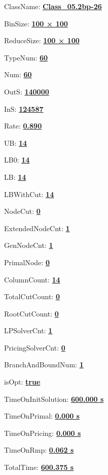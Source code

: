 \documentclass[11pt]{article}
\begin{document}
\pagestyle{empty}


ClassName: \underline{\textbf{Class_05.2bp-26}}
\par
BinSize: \underline{\textbf{100 × 100}}
\par
ReduceSize: \underline{\textbf{100 × 100}}
\par
TypeNum: \underline{\textbf{60}}
\par
Num: \underline{\textbf{60}}
\par
OutS: \underline{\textbf{140000}}
\par
InS: \underline{\textbf{124587}}
\par
Rate: \underline{\textbf{0.890}}
\par
UB: \underline{\textbf{14}}
\par
LB0: \underline{\textbf{14}}
\par
LB: \underline{\textbf{14}}
\par
LBWithCut: \underline{\textbf{14}}
\par
NodeCut: \underline{\textbf{0}}
\par
ExtendedNodeCnt: \underline{\textbf{1}}
\par
GenNodeCnt: \underline{\textbf{1}}
\par
PrimalNode: \underline{\textbf{0}}
\par
ColumnCount: \underline{\textbf{14}}
\par
TotalCutCount: \underline{\textbf{0}}
\par
RootCutCount: \underline{\textbf{0}}
\par
LPSolverCnt: \underline{\textbf{1}}
\par
PricingSolverCnt: \underline{\textbf{0}}
\par
BranchAndBoundNum: \underline{\textbf{1}}
\par
isOpt: \underline{\textbf{true}}
\par
TimeOnInitSolution: \underline{\textbf{600.000 s}}
\par
TimeOnPrimal: \underline{\textbf{0.000 s}}
\par
TimeOnPricing: \underline{\textbf{0.000 s}}
\par
TimeOnRmp: \underline{\textbf{0.062 s}}
\par
TotalTime: \underline{\textbf{600.375 s}}
\par
\newpage


\end{document}
